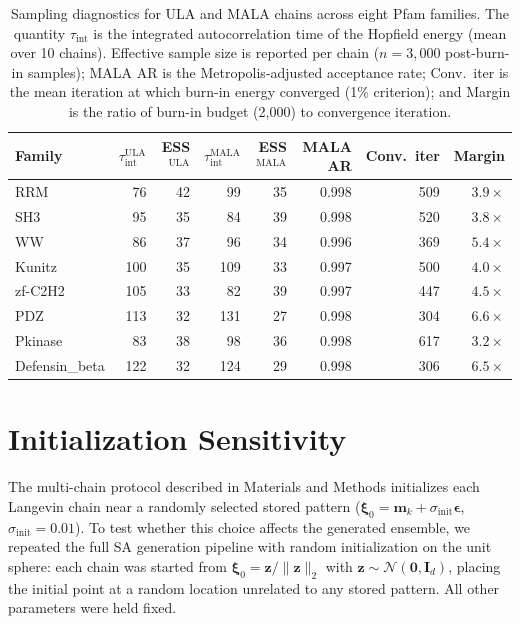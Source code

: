 \documentclass[10pt]{article}
\begin{document}
\begin{table}[ht]
\centering
\caption{Sampling diagnostics for ULA and MALA chains across eight Pfam families. The quantity $\tau_{\mathrm{int}}$ is the integrated autocorrelation time of the Hopfield energy (mean over 10 chains). Effective sample size is reported per chain ($n{=}3{,}000$ post-burn-in samples); MALA AR is the Metropolis-adjusted acceptance rate; Conv.\ iter is the mean iteration at which burn-in energy converged (1\% criterion); and Margin is the ratio of burn-in budget (2{,}000) to convergence iteration.}
\label{tab:sampling-diag}
\small
\begin{tabular}{@{}lrrrrrrr@{}}
\toprule
Family & $\tau_{\mathrm{int}}^{\mathrm{ULA}}$ & ESS$^{\mathrm{ULA}}$ & $\tau_{\mathrm{int}}^{\mathrm{MALA}}$ & ESS$^{\mathrm{MALA}}$ & MALA AR & Conv.\ iter & Margin \\
\midrule
RRM            &  76 &  42 &  99 & 35 & 0.998 &  509 & $3.9\times$ \\
SH3            &  95 &  35 &  84 & 39 & 0.998 &  520 & $3.8\times$ \\
WW             &  86 &  37 &  96 & 34 & 0.996 &  369 & $5.4\times$ \\
Kunitz         & 100 &  35 & 109 & 33 & 0.997 &  500 & $4.0\times$ \\
zf-C2H2        & 105 &  33 &  82 & 39 & 0.997 &  447 & $4.5\times$ \\
PDZ            & 113 &  32 & 131 & 27 & 0.998 &  304 & $6.6\times$ \\
Pkinase        &  83 &  38 &  98 & 36 & 0.998 &  617 & $3.2\times$ \\
Defensin\_beta & 122 &  32 & 124 & 29 & 0.998 &  306 & $6.5\times$ \\
\bottomrule
\end{tabular}
\end{table}

\section{Initialization Sensitivity}\label{si:random-init}

The multi-chain protocol described in Materials and Methods initializes each Langevin chain near a randomly selected stored pattern ($\boldsymbol{\xi}_0 = \mathbf{m}_k + \sigma_{\mathrm{init}}\boldsymbol{\epsilon}$, $\sigma_{\mathrm{init}} = 0.01$). To test whether this choice affects the generated ensemble, we repeated the full SA generation pipeline with random initialization on the unit sphere: each chain was started from $\boldsymbol{\xi}_0 = \mathbf{z}/\|\mathbf{z}\|_2$ with $\mathbf{z} \sim \mathcal{N}(\mathbf{0}, \mathbf{I}_d)$, placing the initial point at a random location unrelated to any stored pattern. All other parameters were held fixed.
\end{document}
